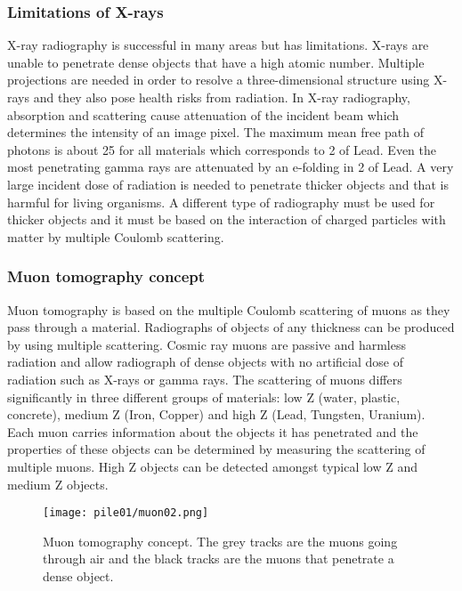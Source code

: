 \documentclass[twoside,titlepage,11pt,twocolumn,a4paper]{article}
\begin{document}
\subsubsection{Limitations of X-rays}
X-ray radiography is successful in many areas but has
limitations. X-rays are unable to penetrate dense objects that have a
high atomic number. Multiple projections are needed in order to
resolve a three-dimensional structure using X-rays and they also pose
health risks from radiation. In X-ray radiography, absorption and
scattering cause attenuation of the incident beam which determines the
intensity of an image pixel. The maximum mean free path of photons is
about \unit{25}{\gram\usk\rpsquare{\centi\metre}} for all materials
which corresponds to \unit{2}{\centi\metre} of Lead.
\citep{Borozdin2003} Even the most penetrating gamma rays are
attenuated by an e-folding in \unit{2}{\centi\metre} of Lead. A very
large incident dose of radiation is needed to penetrate thicker
objects and that is harmful for living organisms.
\citep{Priedhorsky2003} A different type of radiography must be used
for thicker objects and it must be based on the interaction of charged
particles with matter by multiple Coulomb scattering.
\citep{Borozdin2003}

\subsubsection{Muon tomography concept}
Muon tomography is based on the multiple Coulomb scattering of muons
as they pass through a material. Radiographs of objects of any
thickness can be produced by using multiple scattering.  Cosmic ray
muons are passive and harmless radiation and allow radiograph of dense
objects with no artificial dose of radiation such as X-rays or gamma
rays. The scattering of muons differs significantly in three different
groups of materials: low Z (water, plastic, concrete), medium Z (Iron,
Copper) and high Z (Lead, Tungsten, Uranium). \citep{imageRec2004}
Each muon carries information about the objects it has penetrated and
the properties of these objects can be determined by measuring the
scattering of multiple muons. High Z objects can be detected amongst
typical low Z and medium Z objects. \citep{statisticalRec2007}

\begin{figure}
  \texttt{[image: pile01/muon02.png]}
  \caption{Muon tomography concept. The grey tracks are the muons
    going through air and the black tracks are the muons that
    penetrate a dense object. \citep{statisticalRec2007}}
  \label{fig:muon02}
\end{figure}
\end{document}

